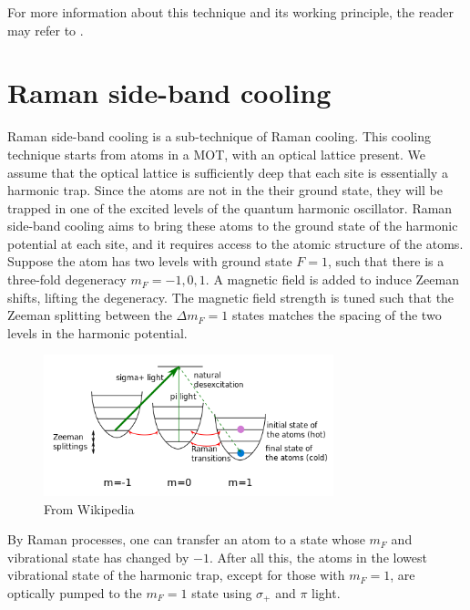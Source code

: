 \documentclass{book}
\theoremstyle{definition}
\begin{document}
For more information about this technique and its working principle, the reader may refer to \cite{PhysRevLett.69.1741}.








\section*{Raman side-band cooling}

Raman side-band cooling is a sub-technique of Raman cooling. This cooling technique starts from atoms in a MOT, with an optical lattice present. We assume that the optical lattice is sufficiently deep that each site is essentially a harmonic trap. Since the atoms are not in the their ground state, they will be trapped in one of the excited levels of the quantum harmonic oscillator. Raman side-band cooling aims to bring these atoms to the ground state of the harmonic potential at each site, and it requires access to the atomic structure of the atoms. \\


Suppose the atom has two levels with ground state $F=1$, such that there is a three-fold degeneracy $m_F = -1,0,1$. A magnetic field is added to induce Zeeman shifts, lifting the degeneracy. The magnetic field strength is tuned such that the Zeeman splitting between the $\Delta m_F = 1$ states matches the spacing of the two levels in the harmonic potential.


\begin{figure}[!htb]
	\centering
	\includegraphics[width=0.75\textwidth]{images/raman_sideband}
	\caption{From Wikipedia}
\end{figure}


By Raman processes, one can transfer an atom to a state whose $m_F$ and vibrational state has changed by $-1$. After all this, the atoms in the lowest vibrational state of the harmonic trap, except for those with $m_F = 1$, are optically pumped to the $m_F = 1$ state using $\sigma_+$ and $\pi$ light. 
\end{document}
